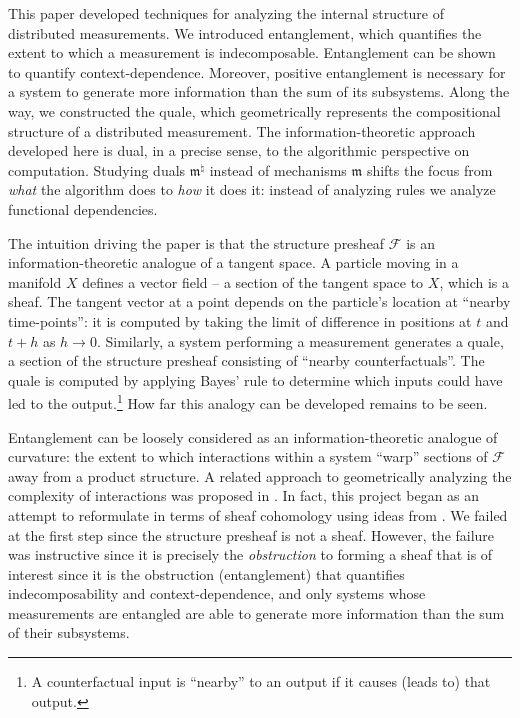 \documentclass[12pt]{article}
\newcommand{\psheaf}{{\mathcal F}}
\newcommand{\fm}{{\mathfrak m}}
\theoremstyle{remark}
\begin{document}
This paper developed techniques for analyzing the internal 
structure of distributed measurements. We introduced 
entanglement, which quantifies the extent to which a 
measurement is indecomposable. Entanglement can be shown 
to quantify context-dependence. Moreover, positive entanglement 
is necessary for a system to generate more information than the 
sum of its subsystems.  Along the way, we constructed the quale,
which geometrically represents the compositional structure of a 
distributed measurement. The information-theoretic approach 
developed here is dual, in a precise sense, to the algorithmic 
perspective on computation. Studying duals $\fm^\natural$ 
instead of mechanisms $\fm$ shifts the focus from \emph{what} 
the algorithm does to \emph{how} it does it: instead of 
analyzing rules we analyze functional dependencies. 

The intuition driving the paper is that the structure presheaf 
$\psheaf$ is an information-theoretic analogue of a tangent 
space. A particle moving in a manifold $X$ defines a vector 
field -- a section of the tangent space to $X$, which is a 
sheaf. The tangent vector at a point depends on the particle's 
location at ``nearby time-points'': it is computed by taking 
the limit of difference in positions at $t$ and $t+h$ as 
$h\rightarrow 0$. Similarly, a system performing a measurement 
generates a quale, a section of the structure presheaf 
consisting of ``nearby counterfactuals''. The quale is computed 
by applying Bayes' rule to determine which inputs could have led
to the output.\footnote{A counterfactual input is ``nearby'' to 
an output if it causes (leads to) that output.} How far this 
analogy can be developed remains to be seen.

Entanglement can be loosely considered as an 
information-theoretic analogue of curvature: the extent to 
which interactions within a system ``warp'' sections of 
$\psheaf$ away from a product structure. A related approach 
to geometrically analyzing the complexity of interactions was 
proposed in \cite{ay:06}. In fact, this project began as an 
attempt to reformulate \cite{bt:09} in terms of sheaf 
cohomology using ideas from \cite{ay:06}. We failed at the 
first step since the structure presheaf is not a sheaf. 
However, the failure was instructive since it is precisely 
the \emph{obstruction} to forming a sheaf that is of interest 
since it is the obstruction (entanglement) that quantifies 
indecomposability and context-dependence, and only systems 
whose measurements are entangled are able to generate more 
information than the sum of their subsystems.
\end{document}
